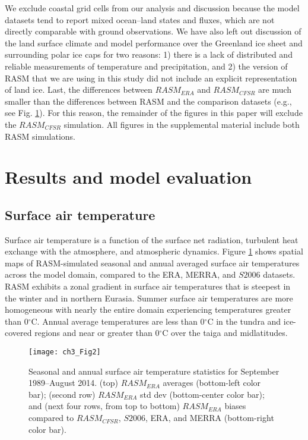 We exclude coastal grid cells from our analysis and discussion because the model datasets tend to report mixed ocean–land states and fluxes, which are not directly comparable with ground observations.
We have also left out discussion of the land surface climate and model performance over the Greenland ice sheet and surrounding polar ice caps for two reasons: 1) there is a lack of distributed and reliable measurements of temperature and precipitation, and 2) the version of RASM that we are using in this study did not include an explicit representation of land ice.
Last, the differences between $RASM_{ERA}$ and $RASM_{CFSR}$ are much smaller than the differences between RASM and the comparison datasets (e.g., see Fig. \ref{fig:temp_maps}).
For this reason, the remainder of the figures in this paper will exclude the $RASM_{CFSR}$ simulation.
All figures in the supplemental material include both RASM simulations.

\section{Results and model evaluation}
\label{sec:results_ch3}

\subsection{Surface air temperature}

Surface air temperature is a function of the surface net radiation, turbulent heat exchange with the atmosphere, and atmospheric dynamics.
Figure \ref{fig:temp_maps} shows spatial maps of RASM-simulated seasonal and annual averaged surface air temperatures across the model domain, compared to the ERA, MERRA, and $S2006$ datasets.
RASM exhibits a zonal gradient in surface air temperatures that is steepest in the winter and in northern Eurasia.
Summer surface air temperatures are more homogeneous with nearly the entire domain experiencing temperatures greater than 0$^{\circ}$C.
Annual average temperatures are less than 0$^{\circ}$C in the tundra and ice-covered regions and near or greater than 0$^{\circ}$C over the taiga and midlatitudes.

\begin{figure}
  \centering
  \texttt{[image: ch3\_Fig2]}
  \caption{Seasonal and annual surface air temperature statistics for September 1989–August 2014.
  (top) $RASM_{ERA}$ averages (bottom-left color bar); (second row) $RASM_{ERA}$ std dev (bottom-center color bar); and (next four rows, from top to bottom) $RASM_{ERA}$ biases compared to $RASM_{CFSR}$, $S2006$, ERA, and MERRA (bottom-right color bar).}
  \label{fig:temp_maps}
\end{figure}

